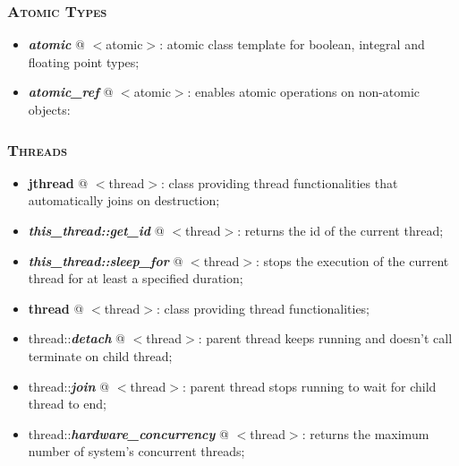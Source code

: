 \documentclass[10pt]{article}
\begin{document}
\begin{multicols*}{4}
{\subsubsection*{\textsc{Atomic Types}} 
\begin{itemize}[leftmargin=*,topsep=0.25pt]
  \setlength\itemsep{-1.8pt}
	\item  \emph{\textbf{atomic}} @ $<$atomic$>$: atomic class template for boolean, integral and floating point types;
	\item  \emph{\textbf{atomic\_ref}} @ $<$atomic$>$: enables atomic operations on non-atomic objects: 
\end{itemize}


\subsubsection*{\textsc{Threads}}
\begin{itemize}[leftmargin=*,topsep=0.25pt]
  \setlength\itemsep{-1.8pt}
	\item  {\textbf{jthread}} @ $<$thread$>$: class providing thread functionalities that automatically joins on destruction;
	\item  \emph{\textbf{this\_thread::get\_id}} @ $<$thread$>$: returns the id of the current thread;
	\item  \emph{\textbf{this\_thread::sleep\_for}} @ $<$thread$>$: stops the execution of the current thread for at least a specified duration;
	\item  {\textbf{thread}} @ $<$thread$>$: class providing thread functionalities;
  \item  thread::\emph{\textbf{detach}} @ $<$thread$>$: parent thread keeps running and doesn't call terminate on child thread;
  \item  thread::\emph{\textbf{join}} @ $<$thread$>$: parent thread stops running to wait for child thread to end;
	\item  thread::\emph{\textbf{hardware\_concurrency}} @ $<$thread$>$: returns the maximum number of system's concurrent threads;
\end{itemize}


}
\end{multicols*}
\end{document}
